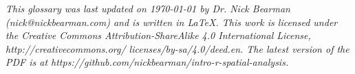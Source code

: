 \documentclass[a4paper,10pt]{article}
\begin{document}
\begin{center}

{\footnotesize \textit{This glossary was last updated on {\today} by Dr. Nick Bearman (nick@nickbearman.com) and is written in LaTeX. This work is licensed under the Creative Commons Attribution-ShareAlike 4.0 International License, http://creativecommons.org/ licenses/by-sa/4.0/deed.en. The latest version of the PDF is at https://github.com/nickbearman/intro-r-spatial-analysis.}}

\end{center}
\end{document}
